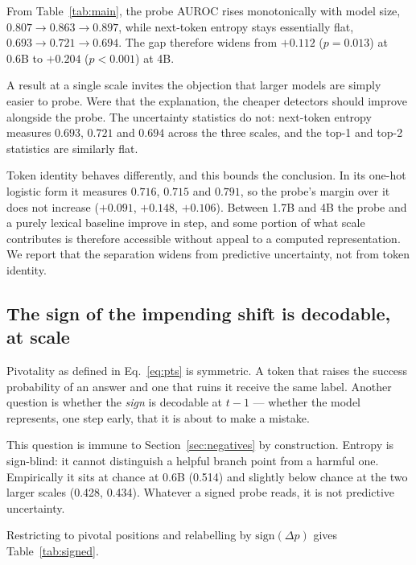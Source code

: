 \documentclass{article}
\newcommand{\pdelta}{\Delta p}
\begin{document}
From Table~\ref{tab:main}, the probe AUROC rises monotonically with model size,
$0.807 \to 0.863 \to 0.897$, while next-token entropy stays essentially
flat, $0.693 \to 0.721 \to 0.694$. The gap therefore widens from $+0.112$
($p{=}0.013$) at 0.6B to $+0.204$ ($p{<}0.001$) at 4B.

A result at a single scale invites the objection that larger models are
simply easier to probe. Were that the explanation, the cheaper detectors
should improve alongside the probe. The uncertainty statistics do not:
next-token entropy measures $0.693$, $0.721$ and $0.694$ across the three
scales, and the top-1 and top-2 statistics are similarly flat.

Token identity behaves differently, and this bounds the conclusion. In its
one-hot logistic form it measures $0.716$, $0.715$ and $0.791$, so the
probe's margin over it does not increase ($+0.091$, $+0.148$, $+0.106$).
Between 1.7B and 4B the probe and a purely lexical baseline improve in
step, and some portion of what scale contributes is therefore accessible
without appeal to a computed representation. We report that the separation widens from predictive
uncertainty, not from token identity.

\subsection{The sign of the impending shift is decodable, at scale}
\label{sec:signed}

Pivotality as defined in Eq.~\ref{eq:pts} is symmetric. A token that
raises the success probability of an answer and one that ruins it receive the same label. 
Another question is whether the \emph{sign} is decodable at $t-1$ --- whether the
model represents, one step early, that it is about to make a mistake.

This question is immune to Section~\ref{sec:negatives} by construction.
Entropy is sign-blind: it cannot distinguish a helpful branch point from a
harmful one. Empirically it sits at chance at 0.6B (0.514) and slightly
below chance at the two larger scales (0.428, 0.434). Whatever a
signed probe reads, it is not predictive uncertainty.

Restricting to pivotal positions and relabelling by
$\mathrm{sign}(\pdelta)$ gives Table~\ref{tab:signed}.
\end{document}
